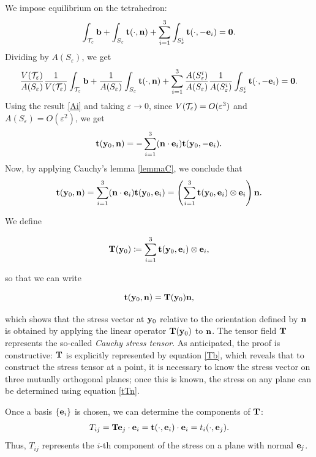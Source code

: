 We impose equilibrium on the tetrahedron:
\begin{equation}
	\int_{\mathcal{T}_\varepsilon} \mathbf{b} + \int_{S_\varepsilon} \mathbf{t}(\cdot, \mathbf{n}) + \sum_{i=1}^{3} \int_{S_\varepsilon^i} \mathbf{t}(\cdot, -\mathbf{e}_i) = \mathbf{0}.
\end{equation}
Dividing by \(A(S_\varepsilon)\), we get
\begin{equation}
	\frac{V(\mathcal{T}_\varepsilon)}{A(S_\varepsilon)} \frac{1}{V(\mathcal{T}_\varepsilon)} \int_{\mathcal{T}_\varepsilon} \mathbf{b} + \frac{1}{A(S_\varepsilon)} \int_{S_\varepsilon} \mathbf{t}(\cdot, \mathbf{n}) + \sum_{i=1}^{3} \frac{A(S^i_\varepsilon)}{A(S_\varepsilon)} \frac{1}{A(S^i_\varepsilon)} \int_{S_\varepsilon^i} \mathbf{t}(\cdot, -\mathbf{e}_i) = \mathbf{0}.
\end{equation}
Using the result \eqref{Ai} and taking \(\varepsilon \to 0\), since \(V(\mathcal{T}_\varepsilon) = O(\varepsilon^3)\) and \(A(S_\varepsilon) = O(\varepsilon^2)\), we get
\[
\mathbf{t}(\mathbf{y}_0, \mathbf{n}) = -\sum_{i=1}^{3} (\mathbf{n} \cdot \mathbf{e}_i) \mathbf{t}(\mathbf{y}_0, -\mathbf{e}_i).
\]
Now, by applying Cauchy’s lemma \eqref{lemmaC}, we conclude that
\[
\mathbf{t}(\mathbf{y}_0, \mathbf{n}) = \sum_{i=1}^{3} (\mathbf{n} \cdot \mathbf{e}_i) \mathbf{t}(\mathbf{y}_0, \mathbf{e}_i) = \left(\sum_{i=1}^{3} \mathbf{t}(\mathbf{y}_0, \mathbf{e}_i) \otimes \mathbf{e}_i \right) \mathbf{n}.
\]

We define
\begin{definition}
	\begin{equation}\label{Tb}
		\mathbf{T}(\mathbf{y}_0) \coloneqq \sum_{i=1}^{3} \mathbf{t}(\mathbf{y}_0, \mathbf{e}_i) \otimes \mathbf{e}_i,
	\end{equation}
\end{definition}
so that we can write
\begin{definition}
	\begin{equation}\label{tTn}
		\mathbf{t}(\mathbf{y}_0, \mathbf{n}) = \mathbf{T}(\mathbf{y}_0) \mathbf{n},
	\end{equation}
\end{definition}
which shows that the stress vector at \(\mathbf{y}_0\) relative to the orientation defined by \(\mathbf{n}\) is obtained by applying the linear operator \(\mathbf{T}(\mathbf{y}_0)\) to \(\mathbf{n}\). The tensor field \(\mathbf{T}\) represents the so-called \textit{Cauchy stress tensor}. As anticipated, the proof is constructive: \(\mathbf{T}\) is explicitly represented by equation \eqref{Tb}, which reveals that to construct the stress tensor at a point, it is necessary to know the stress vector on three mutually orthogonal planes; once this is known, the stress on any plane can be determined using equation \eqref{tTn}.

\newpage
Once a basis \(\{\mathbf{e}_i\}\) is chosen, we can determine the components of \(\mathbf{T}\):
\begin{equation}
	T_{ij} = \mathbf{T} \mathbf{e}_j \cdot \mathbf{e}_i = \mathbf{t}(\cdot, \mathbf{e}_i) \cdot \mathbf{e}_i = t_i(\cdot, \mathbf{e}_j).
\end{equation}
Thus, \(T_{ij}\) represents the \(i\)-th component of the stress on a plane with normal \(\mathbf{e}_j\).

